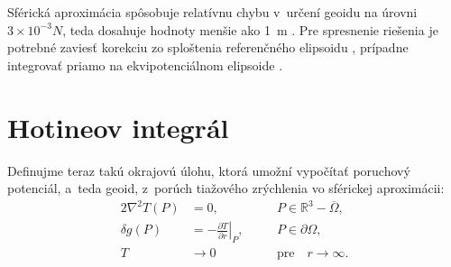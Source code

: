 \documentclass[a4paper,12pt]{book}
\begin{document}
Sférická aproximácia spôsobuje relatívnu chybu v~určení geoidu na úrovni~$3 
\times 10^{-3} N$, teda dosahuje hodnoty menšie ako 1~m 
\parencite{MoritzPhysicalGeodesy}.  Pre spresnenie riešenia je potrebné zaviesť 
korekciu zo sploštenia referenčného elipsoidu \parencite[pozri 
napríklad][]{Claessens2006}, prípadne integrovať priamo na ekvipotenciálnom 
elipsoide \parencite{Martinec1997}.


\section{Hotineov integrál}
\label{sec:hotine_integral}

Definujme teraz takú okrajovú úlohu, ktorá umožní vypočítať poruchový 
potenciál, a~teda geoid, z~porúch tiažového zrýchlenia vo sférickej 
aproximácii:
%
\begin{alignat}{2}
\nabla^2 T(P) &= 0{,} &&P \in \mathbb{R}^3 
- \overline\Omega{,}\label{eq:bvp_dg_laplace}\\
\delta g(P) &= -\left.\frac{\partial T}{\partial r}\right|_P{,} \quad &&P \in 
\partial\Omega{,}\label{eq:bvp_dg_boundary_condition}\\
T &\rightarrow 0 &&\textrm{pre} \quad r \rightarrow 
\infty{.}\label{eq:bvp_dg_t_infty}
\end{alignat}
\end{document}
